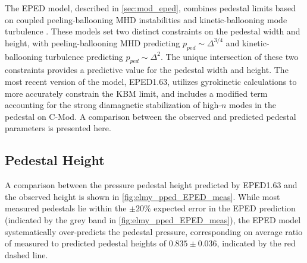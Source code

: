 The EPED model, described in \cref{sec:mod_eped}, combines pedestal limits based on coupled peeling-ballooning MHD instabilities \cite{Snyder2004,Wilson2002,Wilson2006} and kinetic-ballooning mode turbulence \cite{Snyder2001}.  These models set two distinct constraints on the pedestal width and height, with peeling-ballooning MHD predicting $p_{ped} \sim \Delta^{3/4}$ and kinetic-ballooning turbulence predicting $p_{ped} \sim \Delta^2$.  The unique intersection of these two constraints provides a predictive value for the pedestal width and height.  The most recent version of the model, EPED1.63, utilizes gyrokinetic calculations to more accurately constrain the KBM limit, and includes a modified term accounting for the strong diamagnetic stabilization of high-$n$ modes in the pedestal on C-Mod.  A comparison between the observed and predicted pedestal parameters is presented here.

\subsection{Pedestal Height}\label{subsec:elmy_eped_height}

A comparison between the pressure pedestal height predicted by EPED1.63 and the observed height is shown in \cref{fig:elmy_pped_EPED_meas}.  While most measured pedestals lie within the $\pm 20\%$ expected error in the EPED prediction (indicated by the grey band in \cref{fig:elmy_pped_EPED_meas}), the EPED model systematically over-predicts the pedestal pressure, corresponding on average ratio of measured to predicted pedestal heights of $0.835 \pm 0.036$, indicated by the red dashed line.

\begin{figure}[h]
 \pushtooutside
\end{figure}

